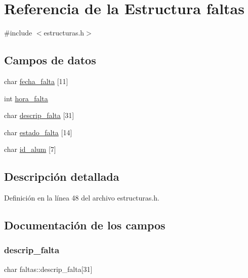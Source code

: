 \hypertarget{structfaltas}{}\section{Referencia de la Estructura faltas}
\label{structfaltas}


{\ttfamily \#include $<$estructuras.\+h$>$}

\subsection*{Campos de datos}
\begin{DoxyCompactItemize}
\item 
char \mbox{\hyperlink{structfaltas_af129c434d523f950657f329ee13598b5}{fecha\+\_\+falta}} \mbox{[}11\mbox{]}
\item 
int \mbox{\hyperlink{structfaltas_a896bc2033259f82ae633907298b3a65d}{hora\+\_\+falta}}
\item 
char \mbox{\hyperlink{structfaltas_a4c7f9998f31cf6251caa0216c7639b24}{descrip\+\_\+falta}} \mbox{[}31\mbox{]}
\item 
char \mbox{\hyperlink{structfaltas_abcd66e5b1e7f572c68cfc2d860289ee3}{estado\+\_\+falta}} \mbox{[}14\mbox{]}
\item 
char \mbox{\hyperlink{structfaltas_adf78bf54f25af0e394df78fc3ef765fa}{id\+\_\+alum}} \mbox{[}7\mbox{]}
\end{DoxyCompactItemize}


\subsection{Descripción detallada}


Definición en la línea 48 del archivo estructuras.\+h.



\subsection{Documentación de los campos}
\mbox{\label{structfaltas_a4c7f9998f31cf6251caa0216c7639b24}} 
\subsubsection{\texorpdfstring{descrip\+\_\+falta}{descrip\_falta}}
{\footnotesize\ttfamily char faltas\+::descrip\+\_\+falta\mbox{[}31\mbox{]}}



